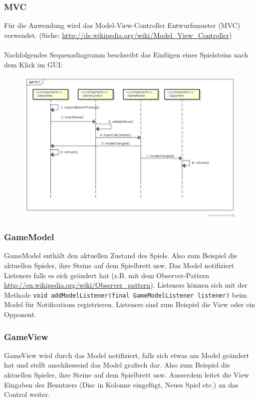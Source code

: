 \documentclass[a4paper, 10pt, fleqn]{article}
\begin{document}
\subsubsection{MVC}
Für die Anwendung wird das Model-View-Controller Entwurfsmuster (MVC) 
verwendet. (Siehe: 
\url{http://de.wikipedia.org/wiki/Model_View_Controller})\\\\
Nachfolgendes Sequenzdiagramm beschreibt das Einfügen eines Spielsteins nach 
dem Klick im GUI:
\begin{figure}[h!]
    \center
    \includegraphics[width=\textwidth]{fig/seq.png}
\end{figure}

\subsubsection{GameModel}
GameModel enthält den aktuellen Zustand des Spiels. Also zum Beispiel die 
aktuellen Spieler, ihre Steine auf dem Spielbrett usw. Das Model notifiziert 
Listeners falls es sich geändert hat (z.B. mit dem Observer-Pattern 
\url{http://en.wikipedia.org/wiki/Observer_pattern}). Listeners können sich 
mit der Methode \verb?void addModelListener(final GameModelListener listener)? 
beim Model für Notifications registrieren. Listeners sind zum Beispiel die 
View oder ein Opponent.

\subsubsection{GameView}
GameView wird durch das Model notifiziert, falls sich etwas am Model geändert 
hat und stellt anschliessend das Model grafisch dar. Also zum Beispiel die 
aktuellen Spieler, ihre Steine auf dem Spielbrett usw. Ausserdem leitet die 
View Eingaben des Benutzers (Disc in Kolonne eingefügt, Neues Spiel etc.) an 
das Control weiter.
\end{document}
